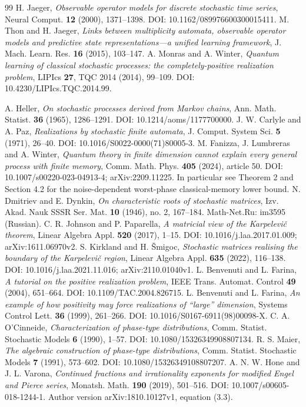 \begin{thebibliography}{99}
 H. Jaeger, \emph{Observable operator models for discrete stochastic time series}, Neural Comput. \textbf{12} (2000), 1371--1398. DOI: 10.1162/089976600300015411.
 M. Thon and H. Jaeger, \emph{Links between multiplicity automata, observable operator models and predictive state representations---a unified learning framework}, J. Mach. Learn. Res. \textbf{16} (2015), 103--147.
 A. Monras and A. Winter, \emph{Quantum learning of classical stochastic processes: the completely-positive realization problem}, LIPIcs \textbf{27}, TQC 2014 (2014), 99--109. DOI: 10.4230/LIPIcs.TQC.2014.99.

 A. Heller, \emph{On stochastic processes derived from Markov chains}, Ann. Math. Statist. \textbf{36} (1965), 1286--1291. DOI: 10.1214/aoms/1177700000.
 J. W. Carlyle and A. Paz, \emph{Realizations by stochastic finite automata}, J. Comput. System Sci. \textbf{5} (1971), 26--40. DOI: 10.1016/S0022-0000(71)80005-3.
 M. Fanizza, J. Lumbreras and A. Winter, \emph{Quantum theory in finite dimension cannot explain every general process with finite memory}, Comm. Math. Phys. \textbf{405} (2024), article 50. DOI: 10.1007/s00220-023-04913-4; arXiv:2209.11225. In particular see Theorem 2 and Section 4.2 for the noise-dependent worst-phase classical-memory lower bound.
 N. Dmitriev and E. Dynkin, \emph{On characteristic roots of stochastic matrices}, Izv. Akad. Nauk SSSR Ser. Mat. \textbf{10} (1946), no. 2, 167--184. Math-Net.Ru: im3595 (Russian).
 C. R. Johnson and P. Paparella, \emph{A matricial view of the Karpelevi\v c theorem}, Linear Algebra Appl. \textbf{520} (2017), 1--15. DOI: 10.1016/j.laa.2017.01.009; arXiv:1611.06970v2.
 S. Kirkland and H. \v Smigoc, \emph{Stochastic matrices realising the boundary of the Karpelevi\v c region}, Linear Algebra Appl. \textbf{635} (2022), 116--138. DOI: 10.1016/j.laa.2021.11.016; arXiv:2110.01040v1.
 L. Benvenuti and L. Farina, \emph{A tutorial on the positive realization problem}, IEEE Trans. Automat. Control \textbf{49} (2004), 651--664. DOI: 10.1109/TAC.2004.826715.
 L. Benvenuti and L. Farina, \emph{An example of how positivity may force realizations of ``large'' dimension}, Systems Control Lett. \textbf{36} (1999), 261--266. DOI: 10.1016/S0167-6911(98)00098-X.
 C. A. O'Cinneide, \emph{Characterization of phase-type distributions}, Comm. Statist. Stochastic Models \textbf{6} (1990), 1--57. DOI: 10.1080/15326349908807134.
 R. S. Maier, \emph{The algebraic construction of phase-type distributions}, Comm. Statist. Stochastic Models \textbf{7} (1991), 573--602. DOI: 10.1080/15326349108807207.
 A. N. W. Hone and J. L. Varona, \emph{Continued fractions and irrationality exponents for modified Engel and Pierce series}, Monatsh. Math. \textbf{190} (2019), 501--516. DOI: 10.1007/s00605-018-1244-1. Author version arXiv:1810.10127v1, equation (3.3).
\end{thebibliography}
